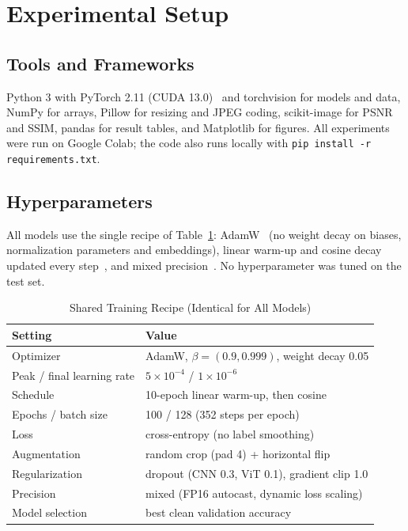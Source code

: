 \documentclass[conference]{IEEEtran}
\begin{document}
\section{Experimental Setup}

\subsection{Tools and Frameworks}
Python 3 with PyTorch 2.11 (CUDA 13.0)~\cite{paszke2019} and torchvision for models and data, NumPy for arrays, Pillow for resizing and JPEG coding, scikit-image for PSNR and SSIM, pandas for result tables, and Matplotlib for figures. All experiments were run on Google Colab; the code also runs locally with \texttt{pip install -r requirements.txt}.

\subsection{Hyperparameters}
All models use the single recipe of Table~\ref{tab:hparams}: AdamW~\cite{loshchilov2019} (no weight decay on biases, normalization parameters and embeddings), linear warm-up and cosine decay updated every step~\cite{loshchilov2017}, and mixed precision~\cite{micikevicius2018}. No hyperparameter was tuned on the test set.

\begin{table}[!t]
\caption{Shared Training Recipe (Identical for All Models)}
\label{tab:hparams}
\centering
\footnotesize
\renewcommand{\arraystretch}{1.1}
\begin{tabular}{@{}ll@{}}
\toprule
\textbf{Setting} & \textbf{Value} \\
\midrule
Optimizer & AdamW, $\beta = (0.9, 0.999)$, weight decay 0.05 \\
Peak / final learning rate & $5\times10^{-4}$ / $1\times10^{-6}$ \\
Schedule & 10-epoch linear warm-up, then cosine \\
Epochs / batch size & 100 / 128 (352 steps per epoch) \\
Loss & cross-entropy (no label smoothing) \\
Augmentation & random crop (pad 4) + horizontal flip \\
Regularization & dropout (CNN 0.3, ViT 0.1), gradient clip 1.0 \\
Precision & mixed (FP16 autocast, dynamic loss scaling) \\
Model selection & best clean validation accuracy \\
\bottomrule
\end{tabular}
\end{table}
\end{document}
